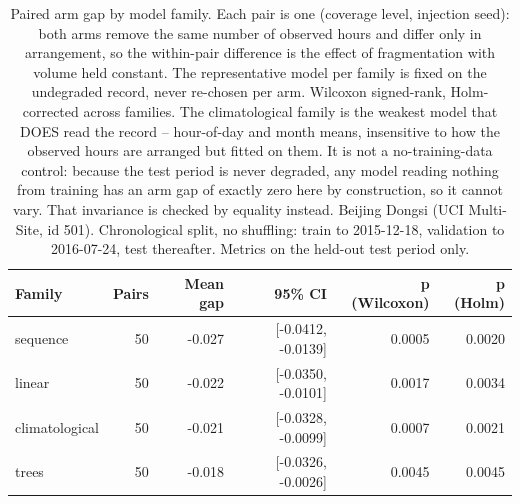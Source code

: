\begin{table}[htbp]
\caption{Paired arm gap by model family. Each pair is one (coverage level, injection seed): both arms remove the same number of observed hours and differ only in arrangement, so the within-pair difference is the effect of fragmentation with volume held constant. The representative model per family is fixed on the undegraded record, never re-chosen per arm. Wilcoxon signed-rank, Holm-corrected across families. The climatological family is the weakest model that DOES read the record -- hour-of-day and month means, insensitive to how the observed hours are arranged but fitted on them. It is not a no-training-data control: because the test period is never degraded, any model reading nothing from training has an arm gap of exactly zero here by construction, so it cannot vary. That invariance is checked by equality instead. Beijing Dongsi (UCI Multi-Site, id 501). Chronological split, no shuffling: train to 2015-12-18, validation to 2016-07-24, test thereafter. Metrics on the held-out test period only.}
\label{tab:ablation_paired_test}
\begin{tabular}{lrrrrr}
\toprule
Family & Pairs & Mean gap & 95\% CI & p (Wilcoxon) & p (Holm) \\
\midrule
sequence & 50 & -0.027 & [-0.0412, -0.0139] & 0.0005 & 0.0020 \\
linear & 50 & -0.022 & [-0.0350, -0.0101] & 0.0017 & 0.0034 \\
climatological & 50 & -0.021 & [-0.0328, -0.0099] & 0.0007 & 0.0021 \\
trees & 50 & -0.018 & [-0.0326, -0.0026] & 0.0045 & 0.0045 \\
\bottomrule
\end{tabular}
\end{table}
